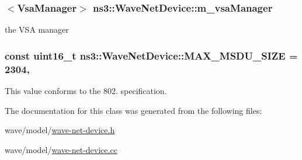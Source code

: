 \subsubsection[{\texorpdfstring{m\+\_\+vsa\+Manager}{m_vsaManager}}]{$<${\bf Vsa\+Manager}$>$ ns3\+::\+Wave\+Net\+Device\+::m\+\_\+vsa\+Manager\hspace{0.3cm}{\ttfamily [private]}}\hypertarget{classns3_1_1WaveNetDevice_a3bec7791c4e2ffc4609e7bf1b75b07b7}{}\label{classns3_1_1WaveNetDevice_a3bec7791c4e2ffc4609e7bf1b75b07b7}


the V\+SA manager 

\subsubsection[{\texorpdfstring{M\+A\+X\+\_\+\+M\+S\+D\+U\+\_\+\+S\+I\+ZE}{MAX_MSDU_SIZE}}]{\setlength{\rightskip}{0pt plus 5cm}const uint16\+\_\+t ns3\+::\+Wave\+Net\+Device\+::\+M\+A\+X\+\_\+\+M\+S\+D\+U\+\_\+\+S\+I\+ZE = 2304\hspace{0.3cm}{\ttfamily [static]}, {\ttfamily [private]}}\hypertarget{classns3_1_1WaveNetDevice_a657b84535129c4bf94fb6720d5052508}{}\label{classns3_1_1WaveNetDevice_a657b84535129c4bf94fb6720d5052508}


This value conforms to the 802. specification. 



The documentation for this class was generated from the following files\+:\begin{DoxyCompactItemize}
\item 
wave/model/\hyperlink{wave-net-device_8h}{wave-\/net-\/device.\+h}\item 
wave/model/\hyperlink{wave-net-device_8cc}{wave-\/net-\/device.\+cc}\end{DoxyCompactItemize}
